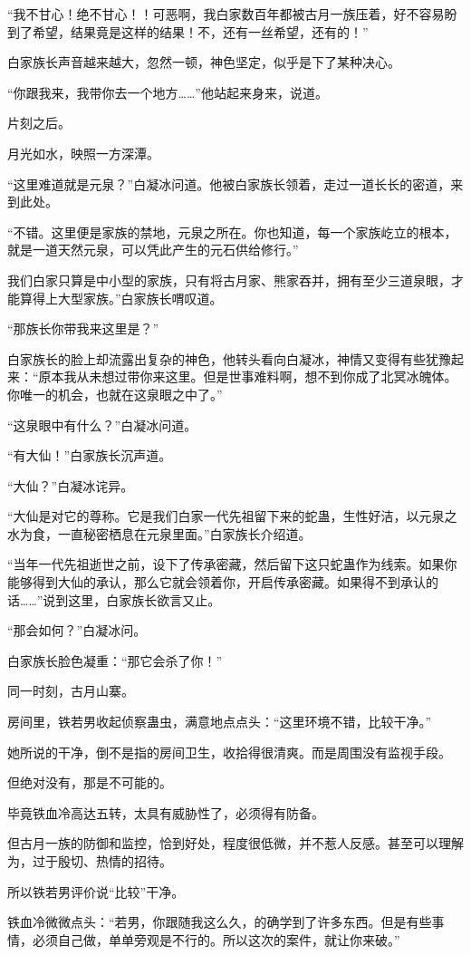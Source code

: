 \begin{this_body}
“我不甘心！绝不甘心！！可恶啊，我白家数百年都被古月一族压着，好不容易盼到了希望，结果竟是这样的结果！不，还有一丝希望，还有的！”

白家族长声音越来越大，忽然一顿，神色坚定，似乎是下了某种决心。

“你跟我来，我带你去一个地方……”他站起来身来，说道。

片刻之后。

月光如水，映照一方深潭。

“这里难道就是元泉？”白凝冰问道。他被白家族长领着，走过一道长长的密道，来到此处。

“不错。这里便是家族的禁地，元泉之所在。你也知道，每一个家族屹立的根本，就是一道天然元泉，可以凭此产生的元石供给修行。”

我们白家只算是中小型的家族，只有将古月家、熊家吞并，拥有至少三道泉眼，才能算得上大型家族。”白家族长喟叹道。

“那族长你带我来这里是？”

白家族长的脸上却流露出复杂的神色，他转头看向白凝冰，神情又变得有些犹豫起来：“原本我从未想过带你来这里。但是世事难料啊，想不到你成了北冥冰魄体。你唯一的机会，也就在这泉眼之中了。”

“这泉眼中有什么？”白凝冰问道。

“有大仙！”白家族长沉声道。

“大仙？”白凝冰诧异。

“大仙是对它的尊称。它是我们白家一代先祖留下来的蛇蛊，生性好洁，以元泉之水为食，一直秘密栖息在元泉里面。”白家族长介绍道。

“当年一代先祖逝世之前，设下了传承密藏，然后留下这只蛇蛊作为线索。如果你能够得到大仙的承认，那么它就会领着你，开启传承密藏。如果得不到承认的话……”说到这里，白家族长欲言又止。

“那会如何？”白凝冰问。

白家族长脸色凝重：“那它会杀了你！”

同一时刻，古月山寨。

房间里，铁若男收起侦察蛊虫，满意地点点头：“这里环境不错，比较干净。”

她所说的干净，倒不是指的房间卫生，收拾得很清爽。而是周围没有监视手段。

但绝对没有，那是不可能的。

毕竟铁血冷高达五转，太具有威胁性了，必须得有防备。

但古月一族的防御和监控，恰到好处，程度很低微，并不惹人反感。甚至可以理解为，过于殷切、热情的招待。

所以铁若男评价说“比较”干净。

铁血冷微微点头：“若男，你跟随我这么久，的确学到了许多东西。但是有些事情，必须自己做，单单旁观是不行的。所以这次的案件，就让你来破。”


\end{this_body}

